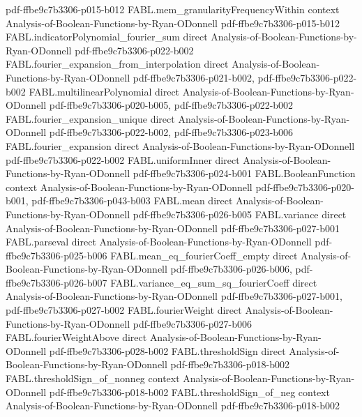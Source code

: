 \begin{theorem}
  {pdf-ffbe9c7b3306-p015-b012}
\proofstep
  {FABL.mem_granularityFrequencyWithin}
  {context}
  {Analysis-of-Boolean-Functions-by-Ryan-ODonnell}
  {pdf-ffbe9c7b3306-p015-b012}
\proofstep
  {FABL.indicatorPolynomial_fourier_sum}
  {direct}
  {Analysis-of-Boolean-Functions-by-Ryan-ODonnell}
  {pdf-ffbe9c7b3306-p022-b002}
\proofstep
  {FABL.fourier_expansion_from_interpolation}
  {direct}
  {Analysis-of-Boolean-Functions-by-Ryan-ODonnell}
  {pdf-ffbe9c7b3306-p021-b002,
    pdf-ffbe9c7b3306-p022-b002}
\proofstep
  {FABL.multilinearPolynomial}
  {direct}
  {Analysis-of-Boolean-Functions-by-Ryan-ODonnell}
  {pdf-ffbe9c7b3306-p020-b005,
    pdf-ffbe9c7b3306-p022-b002}
\proofstep
  {FABL.fourier_expansion_unique}
  {direct}
  {Analysis-of-Boolean-Functions-by-Ryan-ODonnell}
  {pdf-ffbe9c7b3306-p022-b002,
    pdf-ffbe9c7b3306-p023-b006}
\proofstep
  {FABL.fourier_expansion}
  {direct}
  {Analysis-of-Boolean-Functions-by-Ryan-ODonnell}
  {pdf-ffbe9c7b3306-p022-b002}
\proofstep
  {FABL.uniformInner}
  {direct}
  {Analysis-of-Boolean-Functions-by-Ryan-ODonnell}
  {pdf-ffbe9c7b3306-p024-b001}
\proofstep
  {FABL.BooleanFunction}
  {context}
  {Analysis-of-Boolean-Functions-by-Ryan-ODonnell}
  {pdf-ffbe9c7b3306-p020-b001,
    pdf-ffbe9c7b3306-p043-b003}
\proofstep
  {FABL.mean}
  {direct}
  {Analysis-of-Boolean-Functions-by-Ryan-ODonnell}
  {pdf-ffbe9c7b3306-p026-b005}
\proofstep
  {FABL.variance}
  {direct}
  {Analysis-of-Boolean-Functions-by-Ryan-ODonnell}
  {pdf-ffbe9c7b3306-p027-b001}
\proofstep
  {FABL.parseval}
  {direct}
  {Analysis-of-Boolean-Functions-by-Ryan-ODonnell}
  {pdf-ffbe9c7b3306-p025-b006}
\proofstep
  {FABL.mean_eq_fourierCoeff_empty}
  {direct}
  {Analysis-of-Boolean-Functions-by-Ryan-ODonnell}
  {pdf-ffbe9c7b3306-p026-b006,
    pdf-ffbe9c7b3306-p026-b007}
\proofstep
  {FABL.variance_eq_sum_sq_fourierCoeff}
  {direct}
  {Analysis-of-Boolean-Functions-by-Ryan-ODonnell}
  {pdf-ffbe9c7b3306-p027-b001,
    pdf-ffbe9c7b3306-p027-b002}
\proofstep
  {FABL.fourierWeight}
  {direct}
  {Analysis-of-Boolean-Functions-by-Ryan-ODonnell}
  {pdf-ffbe9c7b3306-p027-b006}
\proofstep
  {FABL.fourierWeightAbove}
  {direct}
  {Analysis-of-Boolean-Functions-by-Ryan-ODonnell}
  {pdf-ffbe9c7b3306-p028-b002}
\proofstep
  {FABL.thresholdSign}
  {direct}
  {Analysis-of-Boolean-Functions-by-Ryan-ODonnell}
  {pdf-ffbe9c7b3306-p018-b002}
\proofstep
  {FABL.thresholdSign_of_nonneg}
  {context}
  {Analysis-of-Boolean-Functions-by-Ryan-ODonnell}
  {pdf-ffbe9c7b3306-p018-b002}
\proofstep
  {FABL.thresholdSign_of_neg}
  {context}
  {Analysis-of-Boolean-Functions-by-Ryan-ODonnell}
  {pdf-ffbe9c7b3306-p018-b002}

\end{theorem}
